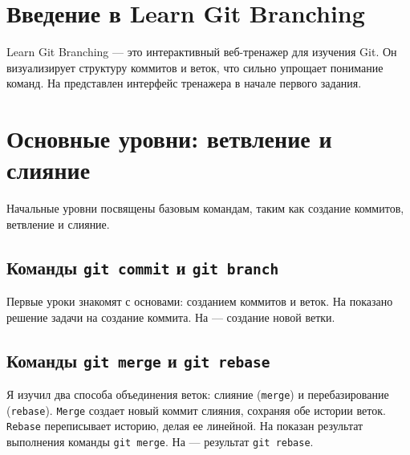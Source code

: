 \section{Введение в Learn Git Branching}\label{sec:--learn-git-branching}
Learn Git Branching — это интерактивный веб-тренажер для изучения Git.
Он визуализирует структуру коммитов и веток, что сильно упрощает понимание команд.
На  представлен интерфейс тренажера в начале первого задания.

\label{fig:lgb_main_screen}


\section{Основные уровни: ветвление и слияние}\label{sec:-:---}
Начальные уровни посвящены базовым командам, таким как создание коммитов, ветвление и слияние.

\subsection{Команды \texttt{git commit} и \texttt{git branch}}\label{subsec:-texttt{git-commit}--texttt{git-branch}}
Первые уроки знакомят с основами: созданием коммитов и веток.
На  показано решение задачи на создание коммита.
На  — создание новой ветки.

\label{fig:lgb_commit}

\label{fig:lgb_branch}

\subsection{Команды \texttt{git merge} и \texttt{git rebase}}\label{subsec:-texttt{git-merge}--texttt{git-rebase}}
Я изучил два способа объединения веток: слияние (\texttt{merge}) и перебазирование (\texttt{rebase}).
\texttt{Merge} создает новый коммит слияния, сохраняя обе истории веток.
\texttt{Rebase} переписывает историю, делая ее линейной.
На  показан результат выполнения команды \texttt{git merge}.
На  — результат \texttt{git rebase}.

\label{fig:lgb_merge}


